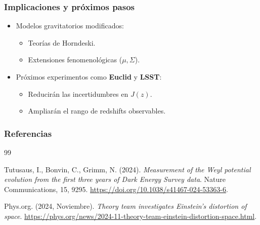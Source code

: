 \documentclass{beamer}
\begin{document}
\begin{frame}
\frametitle{Implicaciones y próximos pasos}
\begin{itemize}
    \item Modelos gravitatorios modificados:
    \begin{itemize}
        \item Teorías de Horndeski.
        \item Extensiones fenomenológicas (\( \mu, \Sigma \)).
    \end{itemize}
    \item Próximos experimentos como \textbf{Euclid} y \textbf{LSST}:
    \begin{itemize}
        \item Reducirán las incertidumbres en \( J(z) \).
        \item Ampliarán el rango de redshifts observables.
    \end{itemize}
\end{itemize}
\end{frame}

\begin{frame}[allowframebreaks]
\frametitle{Referencias}

\begin{thebibliography}{99}

Tutusaus, I., Bonvin, C., Grimm, N. (2024). \textit{Measurement of the Weyl potential evolution from the first three years of Dark Energy Survey data}. Nature Communications, 15, 9295. \url{https://doi.org/10.1038/s41467-024-53363-6}.

Phys.org. (2024, Noviembre). \textit{Theory team investigates Einstein's distortion of space}. \url{https://phys.org/news/2024-11-theory-team-einstein-distortion-space.html}.

\end{thebibliography}

\end{frame}
\end{document}
